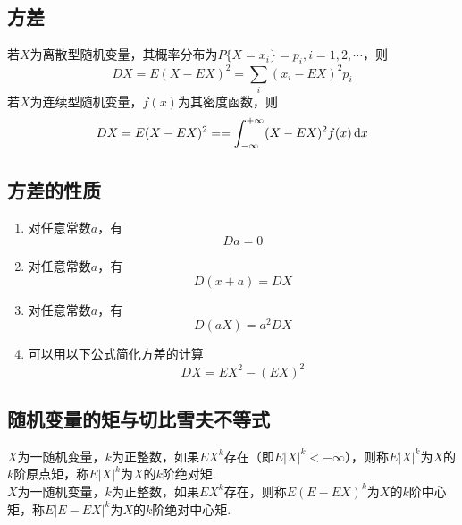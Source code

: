 \subsection{方差}
若$X$为离散型随机变量，其概率分布为$P\lbrace X=x_i \rbrace =p_i,i=1,2,\cdots $，则
\begin{equation}
	DX=E(X-EX)^2=\sum\limits_{i}(x_i-EX)^2p_i
\end{equation}
若$X$为连续型随机变量，$f(x)$为其密度函数，则
\begin{equation}
DX=E(X-EX)^2==\int_{-\infty}^{+\infty }(X-EX)^2f(x)\,{\rm{d}} x
\end{equation}

\subsection{方差的性质}
\begin{enumerate}
	\setlength{\itemindent}{2em}
	\setlength{\topsep}{0.01em}
	\setlength{\itemsep}{0.01em}
	\item 对任意常数$a$，有
	\begin{equation}
	Da=0
	\end{equation}
	\item 对任意常数$a$，有
	\begin{equation}
	D(x+a)=DX
	\end{equation}
	\item 对任意常数$a$，有
	\begin{equation}
	D(aX)=a^2DX
	\end{equation}
	\item 可以用以下公式简化方差的计算
	\begin{equation}
	DX=EX^2-(EX)^2
	\end{equation}
\end{enumerate}

\subsection{随机变量的矩与切比雪夫不等式}
\tdefination[$k$阶原点矩]
$X$为一随机变量，$k$为正整数，如果$EX^k$存在（即$E|X|^k<-\infty $），则称$E|X|^k$为$X$的$k$阶原点矩，称$E|X|^k$为$X$的$k$阶绝对矩.\jg\\
\tdefination[$k$阶原点矩]
$X$为一随机变量，$k$为正整数，如果$EX^k$存在，则称$E\left( E-EX\right) ^k$为$X$的$k$阶中心矩，称$E\left| E-EX\right| ^k$为$X$的$k$阶绝对中心矩.


